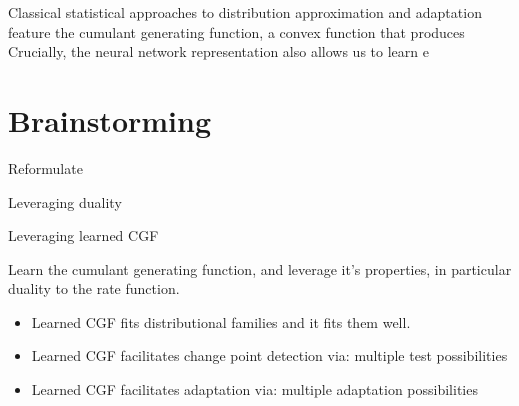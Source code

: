 \documentclass[11pt]{article}      %
\begin{document}
Classical statistical approaches to distribution approximation and adaptation feature the cumulant generating function, a convex function that produces
Crucially, the neural network representation also allows us to learn e



\section{Brainstorming}
Reformulate

Leveraging duality 

Leveraging learned CGF

Learn the cumulant generating function, and leverage it's properties, in particular duality to the rate function.

\begin{itemize}
  \item Learned CGF fits distributional families and it fits them well.
  \item Learned CGF facilitates change point detection via: multiple test possibilities
  \item Learned CGF facilitates adaptation via: multiple adaptation possibilities
\end{itemize}




\end{document}
